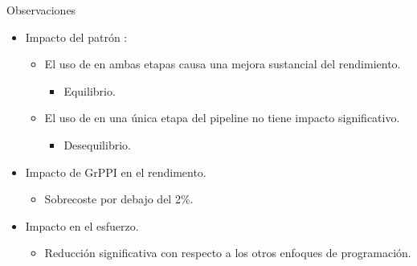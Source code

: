 \begin{frame}{Observaciones}
\begin{itemize}
  \item Impacto del patrón :
    \begin{itemize}
      \item El uso de  en ambas etapas causa una mejora sustancial del rendimiento.
        \begin{itemize}
          \item Equilibrio.
        \end{itemize}
      \item El uso de  en una única etapa del pipeline no tiene impacto significativo.
        \begin{itemize}
          \item Desequilibrio.
        \end{itemize}
    \end{itemize}

  \vfill\pause
  \item Impacto de GrPPI en el rendimento.
    \begin{itemize}
      \item Sobrecoste por debajo del 2\%.
    \end{itemize}

  \vfill\pause
  \item Impacto en el esfuerzo.
    \begin{itemize}
      \item Reducción significativa con respecto a los otros enfoques de programación.
    \end{itemize}
\end{itemize}
\end{frame}

